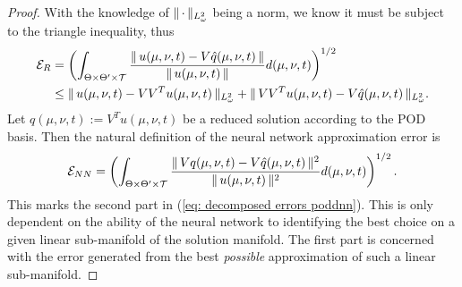 \begin{proof}
    With the knowledge of $\lVert \,  \cdot  \, \rVert_{L^2_\omega}$ being a norm, we know it must be subject to the triangle inequality, thus
    \begin{align}
        \mathcal{E}_R &= \left( \int_{\Theta \times \Theta' \times \mathcal{T}} \frac{\lVert \, u(\mu, \nu, t) - V \hat{q}(\mu, \nu, t) \, \rVert}{\lVert \, u(\mu, \nu, t) \, \rVert} d(\mu, \nu, t) \right)^{1/2} \\ \label{eq: decomposed errors poddnn}
        &\leq \lVert \, u(\mu, \nu, t) - V V^T u(\mu, \nu, t) \, \rVert_{L_\omega^2} + \lVert \, V V^T u(\mu, \nu, t) - V \hat{q}(\mu, \nu, t) \, \rVert_{L^2_\omega}.
    \end{align}
    Let $q(\mu, \nu, t) := V^T u(\mu, \nu, t)$ be a reduced solution according to the POD basis. Then the natural definition of the neural network approximation error is
    \begin{equation}
        \mathcal{E}_{NN} = \left( \int_{\Theta \times \Theta' \times \mathcal{T}} \frac{\lVert \, V q (\mu, \nu, t) - V \hat{q}(\mu, \nu, t) \, \rVert^2}{\lVert \, u(\mu, \nu, t) \, \rVert^2} d(\mu, \nu, t) \right)^{1/2}.
    \end{equation}
    This marks the second part in (\ref{eq: decomposed errors poddnn}). This is only dependent on the ability of the neural network to identifying the best choice on a given linear sub-manifold of the solution manifold. The first part is concerned with the error generated from the best \emph{possible} approximation of such a linear sub-manifold.
    

\end{proof}
